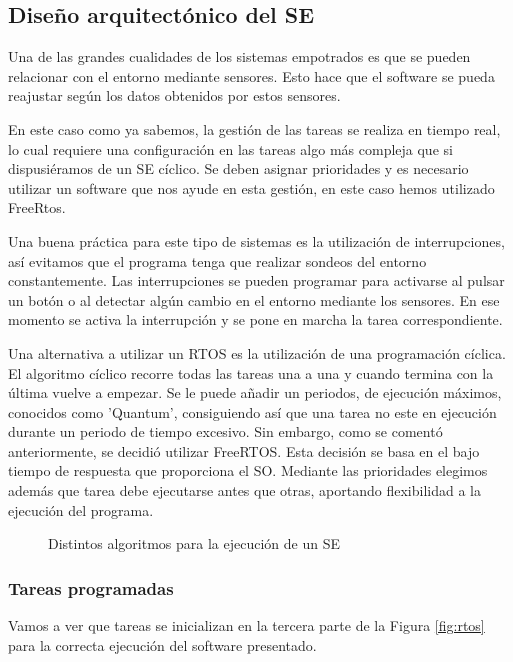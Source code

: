 \subsection{Diseño arquitectónico del SE}
Una de las grandes cualidades de los sistemas empotrados es que se pueden relacionar con el entorno mediante sensores. Esto hace que el software se pueda reajustar según los datos obtenidos por estos sensores. 

En este caso como ya sabemos, la gestión de las tareas se realiza en tiempo real, lo cual requiere una configuración en las tareas algo más compleja que si dispusiéramos de un SE cíclico. Se deben asignar prioridades y es necesario utilizar un software que nos ayude en esta gestión, en este caso hemos utilizado FreeRtos.

Una buena práctica para este tipo de sistemas es la utilización de interrupciones, así evitamos que el programa tenga que realizar sondeos del entorno constantemente. Las interrupciones se pueden programar para activarse al pulsar un botón o al detectar algún cambio en el entorno mediante los sensores. En ese momento se activa la interrupción y se pone en marcha la tarea correspondiente.

Una alternativa a utilizar un RTOS es la utilización de una programación cíclica. El algoritmo cíclico recorre todas las tareas una a una y cuando termina con la última vuelve a empezar. Se le puede añadir un periodos, de ejecución máximos, conocidos como 'Quantum', consiguiendo así que una tarea no este en ejecución durante un periodo de tiempo excesivo. 
Sin embargo, como se comentó anteriormente, se decidió utilizar FreeRTOS. Esta decisión se basa en el bajo tiempo de respuesta que proporciona el SO. Mediante las prioridades elegimos además que tarea debe ejecutarse antes que otras, aportando flexibilidad a la ejecución del programa.

\begin{figure}
 \centering
 \caption{Distintos algoritmos para la ejecución de un SE}
 \label{tiposProg}
\end{figure}

\subsubsection{Tareas programadas}
Vamos a ver que tareas se inicializan en la tercera parte de la Figura \ref{fig:rtos} para la correcta ejecución del software presentado.

